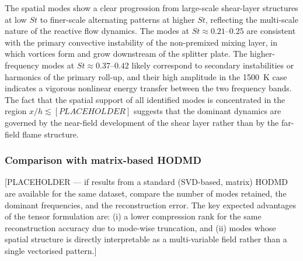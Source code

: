 The spatial modes show a clear progression from large-scale shear-layer structures at
low $St$ to finer-scale alternating patterns at higher $St$, reflecting the multi-scale
nature of the reactive flow dynamics.
The modes at $St \approx 0.21$--$0.25$ are consistent with the primary convective
instability of the non-premixed mixing layer, in which vortices form and grow
downstream of the splitter plate.
The higher-frequency modes at $St \approx 0.37$--$0.42$ likely correspond to secondary
instabilities or harmonics of the primary roll-up, and their high amplitude in the
1500~K case indicates a vigorous nonlinear energy transfer between the two frequency
bands.
The fact that the spatial support of all identified modes is concentrated in the region
$x/h \lesssim [PLACEHOLDER]$ suggests that the dominant dynamics are governed by the
near-field development of the shear layer rather than by the far-field flame structure.

\subsubsection*{Comparison with matrix-based HODMD}

[PLACEHOLDER — if results from a standard (SVD-based, matrix) HODMD are available for
the same dataset, compare the number of modes retained, the dominant frequencies, and
the reconstruction error.
The key expected advantages of the tensor formulation are: (i) a lower compression rank
for the same reconstruction accuracy due to mode-wise truncation, and (ii) modes whose
spatial structure is directly interpretable as a multi-variable field rather than a
single vectorised pattern.]


